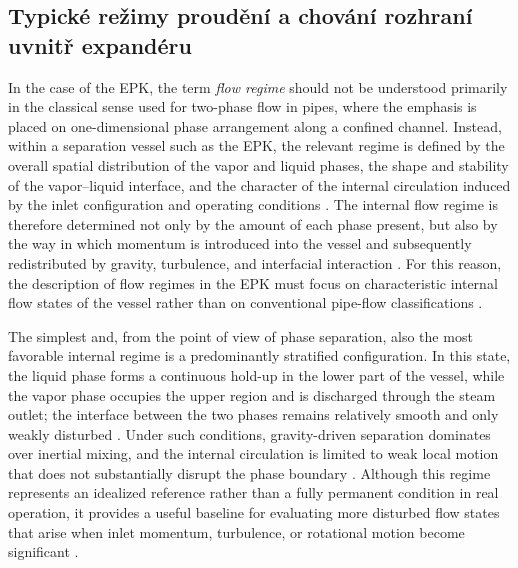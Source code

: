 \subsection{Typické režimy proudění a chování rozhraní uvnitř expandéru}

In the case of the EPK, the term \emph{flow regime} should not be understood primarily in the classical sense used for two-phase flow in pipes, where the emphasis is placed on one-dimensional phase arrangement along a confined channel. Instead, within a separation vessel such as the EPK, the relevant regime is defined by the overall spatial distribution of the vapor and liquid phases, the shape and stability of the vapor--liquid interface, and the character of the internal circulation induced by the inlet configuration and operating conditions \cite{IshiiHibiki2011,LeeEtAl2019}. The internal flow regime is therefore determined not only by the amount of each phase present, but also by the way in which momentum is introduced into the vessel and subsequently redistributed by gravity, turbulence, and interfacial interaction \cite{IshiiHibiki2011}. For this reason, the description of flow regimes in the EPK must focus on characteristic internal flow states of the vessel rather than on conventional pipe-flow classifications \cite{IshiiHibiki2011}.

The simplest and, from the point of view of phase separation, also the most favorable internal regime is a predominantly stratified configuration. In this state, the liquid phase forms a continuous hold-up in the lower part of the vessel, while the vapor phase occupies the upper region and is discharged through the steam outlet; the interface between the two phases remains relatively smooth and only weakly disturbed \cite{IshiiHibiki2011,HarunEtAl2019}. Under such conditions, gravity-driven separation dominates over inertial mixing, and the internal circulation is limited to weak local motion that does not substantially disrupt the phase boundary \cite{IshiiHibiki2011}. Although this regime represents an idealized reference rather than a fully permanent condition in real operation, it provides a useful baseline for evaluating more disturbed flow states that arise when inlet momentum, turbulence, or rotational motion become significant \cite{HarunEtAl2019,LeeEtAl2019}.

